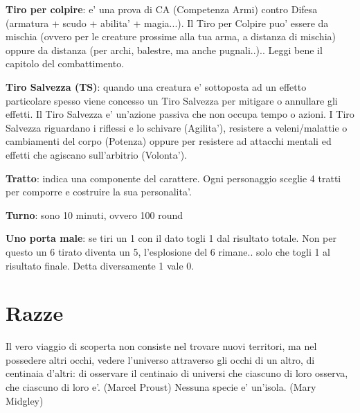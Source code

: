 \documentclass[a4paper,11pt,twoside,openany]{dndbook}
\begin{document}
\textbf{Tiro per colpire}: e' una prova di CA (Competenza Armi) contro Difesa (armatura + scudo + abilita' + magia...). Il Tiro per Colpire puo' essere da mischia (ovvero per le creature prossime alla tua arma, a distanza di mischia) oppure da distanza (per archi, balestre, ma anche pugnali..).. Leggi bene il capitolo del combattimento.

\textbf{Tiro Salvezza (TS)}: quando una creatura e' sottoposta ad un effetto particolare spesso viene concesso un Tiro Salvezza per mitigare o annullare gli effetti. Il Tiro Salvezza e' un'azione passiva che non occupa tempo o azioni. 
I Tiro Salvezza riguardano i riflessi e lo schivare (Agilita'), resistere a veleni/malattie o cambiamenti del corpo (Potenza) oppure per resistere ad attacchi mentali ed effetti che agiscano sull'arbitrio (Volonta').

\textbf{Tratto}: indica una componente del carattere. Ogni personaggio sceglie 4 tratti per comporre e costruire la sua personalita'.

\textbf{Turno}: sono 10 minuti, ovvero 100 round

\textbf{Uno porta male}: se tiri un 1 con il dato togli 1 dal risultato totale. Non per questo un 6 tirato diventa un 5, l’esplosione del 6 rimane.. solo che togli 1 al risultato finale. Detta diversamente 1 vale 0.



\pagebreak


\section{Razze}

\begin{quotebox}
Il vero viaggio di scoperta non consiste nel trovare nuovi territori, ma nel possedere altri occhi, vedere l'universo attraverso gli occhi di un altro, di centinaia d'altri: di osservare il centinaio di universi che ciascuno di loro osserva, che ciascuno di loro e'. (Marcel Proust)\linebreak
\linebreak
Nessuna specie e' un'isola. (Mary Midgley)
\end{quotebox}
\end{document}
